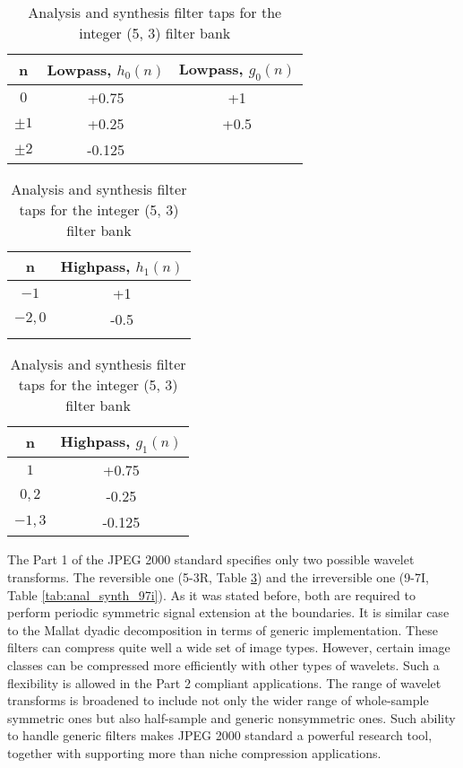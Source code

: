 \begin{table}
    \centering
    \caption{Analysis and synthesis filter taps for the integer (5, 3) filter bank}
    \label{tab:anal_synth_53r}
\begin{tabular}{ccc}
    \toprule
    n         & Lowpass, $h_{0}(n)$ & Lowpass, $g_{0}(n)$ \\
    \midrule
    $0$       & +0.75  & +1    \\
    $\pm 1$   & +0.25  & +0.5  \\
    $\pm 2$   & -0.125 &       \\
    \bottomrule
\end{tabular}

\bigskip
\bigskip


\begin{tabular}{cc}
    \toprule
    n         & Highpass, $h_{1}(n)$ \\
    \midrule
    $-1$      & +1   \\
    $-2, 0$   & -0.5 \\
              &      \\
    \bottomrule
\end{tabular}
\quad
\begin{tabular}{cc}
    \toprule
    n        & Highpass, $g_{1}(n)$ \\
    \midrule
    $1$      & +0.75  \\
    $0, 2$   & -0.25  \\
    $-1, 3$  & -0.125 \\
    \bottomrule
\end{tabular}
\end{table}

The Part 1 of the JPEG 2000 standard specifies only two possible wavelet transforms.
The reversible one (5-3R, Table \ref{tab:anal_synth_53r}) and the irreversible one
(9-7I, Table \ref{tab:anal_synth_97i}). As it was stated before, both
are required to perform periodic symmetric signal extension at the boundaries.
It is similar case to the Mallat dyadic decomposition in terms of generic implementation.
These filters can compress quite well a wide set of image types. However, certain image
classes can be compressed more efficiently with other types of wavelets. Such a flexibility
is allowed in the Part 2 compliant applications. The range of wavelet transforms is broadened
to include not only the wider range of whole-sample symmetric ones but also half-sample and
generic nonsymmetric ones. Such ability to handle generic filters makes JPEG 2000 standard
a powerful research tool, together with supporting more than niche compression applications.  \cite{jpeg_suite}

